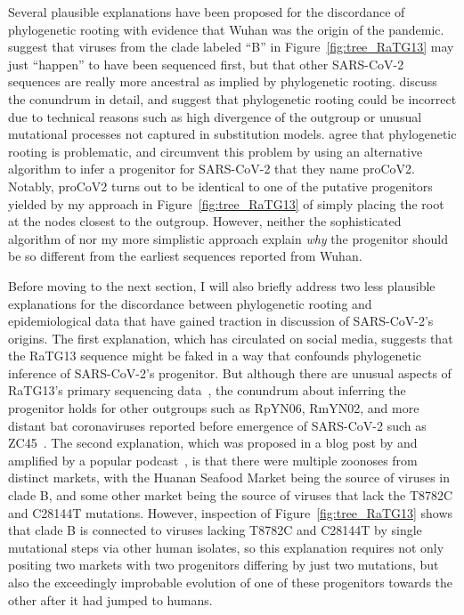 \documentclass[9pt,twocolumn,twoside]{gsajnl_modified}
\begin{document}
Several plausible explanations have been proposed for the discordance of phylogenetic rooting with evidence that Wuhan was the origin of the pandemic.
\citet{rambaut2020dynamic} suggest that viruses from the clade labeled ``B'' in Figure~\ref{fig:tree_RaTG13} may just ``happen'' to have been sequenced first, but that other SARS-CoV-2 sequences are really more ancestral as implied by phylogenetic rooting.
\citet{pipes2021assessing} discuss the conundrum in detail, and suggest that phylogenetic rooting could be incorrect due to technical reasons such as high divergence of the outgroup or unusual mutational processes not captured in substitution models.
\citet{kumar2021evolutionary} agree that phylogenetic rooting is problematic, and circumvent this problem by using an alternative algorithm to infer a progenitor for SARS-CoV-2 that they name proCoV2.
Notably, proCoV2 turns out to be identical to one of the putative progenitors yielded by my approach in Figure~\ref{fig:tree_RaTG13} of simply placing the root at the nodes closest to the outgroup.
However, neither the sophisticated algorithm of \citet{kumar2021evolutionary} nor my more simplistic approach explain \emph{why} the progenitor should be so different from the earliest sequences reported from Wuhan.

Before moving to the next section, I will also briefly address two less plausible explanations for the discordance between phylogenetic rooting and epidemiological data that have gained traction in discussion of SARS-CoV-2's origins.
The first explanation, which has circulated on social media, suggests that the RaTG13 sequence might be faked in a way that confounds phylogenetic inference of SARS-CoV-2's progenitor.
But although there are unusual aspects of RaTG13's primary sequencing data~\citep{singla2020novo,rahalkar2020anomalous}, the conundrum about inferring the progenitor holds for other outgroups such as RpYN06, RmYN02, and more distant bat coronaviruses reported before emergence of SARS-CoV-2 such as ZC45~\citep{tang2020origin}.
The second explanation, which was proposed in a blog post by \citet{garry2021early} and amplified by a popular podcast~\citep{twiv2021}, is that there were multiple zoonoses from distinct markets, with the Huanan Seafood Market being the source of viruses in clade B, and some other market being the source of viruses that lack the T8782C and C28144T mutations.
However, inspection of Figure~\ref{fig:tree_RaTG13} shows that clade B is connected to viruses lacking T8782C and C28144T by single mutational steps via other human isolates, so this explanation requires not only positing two markets with two progenitors differing by just two mutations, but also the exceedingly improbable evolution of one of these progenitors towards the other after it had jumped to humans.
\end{document}

